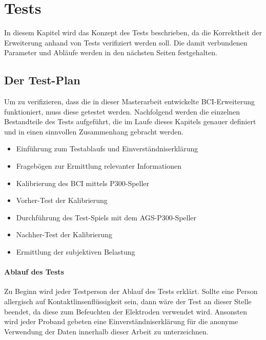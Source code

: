 \chapter{Tests}

In diesem Kapitel wird das Konzept des Tests beschrieben, da die Korrektheit der Erweiterung anhand von Tests verifiziert werden soll.
Die damit verbundenen Parameter und Abläufe werden in den nächsten Seiten festgehalten.


\section{Der Test-Plan}

Um zu verifizieren, dass die in dieser Masterarbeit entwickelte BCI-Erweiterung funktioniert, muss diese getestet werden.
Nachfolgend werden die einzelnen Bestandteile des Tests aufgeführt, die im Laufe dieses Kapitels genauer definiert 
und in einen sinnvollen Zusammenhang gebracht werden.

\begin{itemize}
\item Einführung zum Testablaufs und Einverständniserklärung
\item Fragebögen zur Ermittlung relevanter Informationen
\item Kalibrierung des BCI mittels P300-Speller
\item Vorher-Test der Kalibrierung
\item Durchführung des Test-Spiels mit dem AGS-P300-Speller
\item Nachher-Test der Kalibrierung
\item Ermittlung der subjektiven Belastung\\
\end{itemize}


\subsubsection{Ablauf des Tests}

Zu Beginn wird jeder Testperson der Ablauf des Tests erklärt.
Sollte eine Person allergisch auf Kontaktlinsenflüssigkeit sein, dann wäre der Test an dieser Stelle beendet, da diese zum Befeuchten der Elektroden verwendet wird.
Ansonsten wird jeder Proband gebeten eine Einverständniserklärung für die anonyme Verwendung der Daten innerhalb dieser Arbeit zu unterzeichnen.\\

